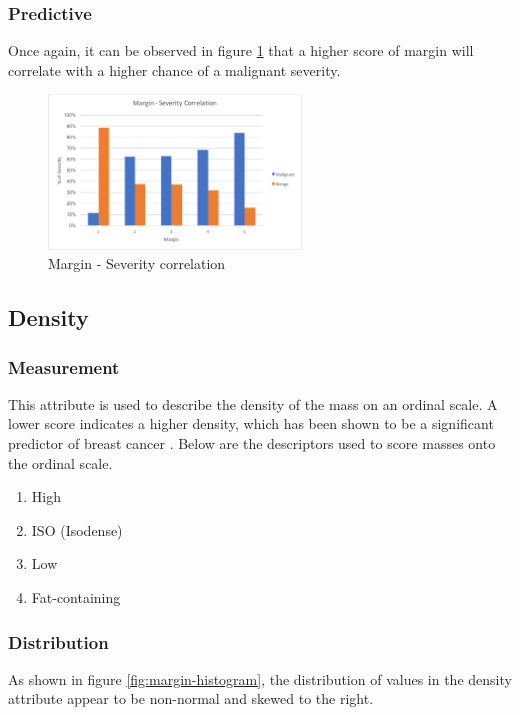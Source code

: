 \documentclass[12pt]{article}
\begin{document}
      \subsubsection{Predictive}
        Once again, it can be observed in figure \ref{fig:margin-severity-correlation} that a higher score of margin will correlate with a higher chance of a malignant severity.

        \begin{figure}[H]
          \centering
          \includegraphics[width=0.6\textwidth]{margin-severity-correlation}
          \caption{Margin - Severity correlation}
          \label{fig:margin-severity-correlation}
        \end{figure}

    \subsection{Density}
      \subsubsection{Measurement}
        This attribute is used to describe the density of the mass on an ordinal scale. A lower score indicates a higher density, which has been shown to be a significant predictor of breast cancer \citep{woods2011mammographic}. Below are the descriptors used to score masses onto the ordinal scale.

        \singlespacing
        \begin{enumerate}[label=\arabic*)]
          \item High
          \item ISO (Isodense)
          \item Low
          \item Fat-containing
        \end{enumerate}
        \doublespacing

      \subsubsection{Distribution}
        As shown in figure \ref{fig:margin-histogram}, the distribution of values in the density attribute appear to be non-normal and skewed to the right.
\end{document}
